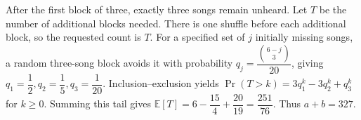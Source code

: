 After the first block of three, exactly three songs remain unheard. Let $T$ be the number of additional blocks needed. There is one shuffle before each additional block, so the requested count is $T$. For a specified set of $j$ initially missing songs, a random three-song block avoids it with probability $q_j=\dfrac{\binom{6-j}{3}}{20}$, giving $q_1=\dfrac{1}{2},q_2=\dfrac{1}{5},q_3=\dfrac{1}{20}$. Inclusion--exclusion yields $\Pr(T>k)=3q_1^k-3q_2^k+q_3^k$ for $k\ge0$. Summing this tail gives $\mathbb E[T]=6-\dfrac{15}{4}+\dfrac{20}{19}=\dfrac{251}{76}$. Thus $\boxed{a+b=327}$.
